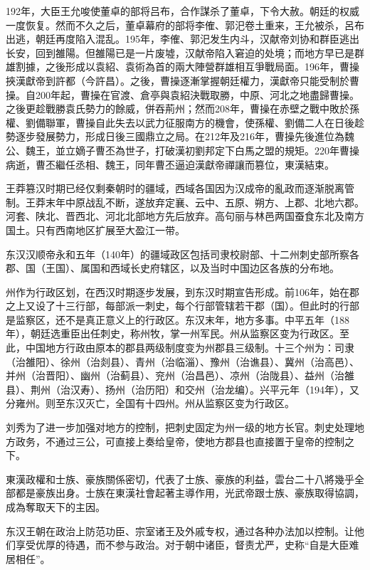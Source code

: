 192年，大臣王允唆使董卓的部将吕布，合作謀杀了董卓，下令大赦。朝廷的权威一度恢复。然而不久之后，董卓幕府的部将李傕、郭汜卷土重来，王允被杀，呂布出逃，朝廷再度陷入混乱。195年，李傕、郭汜发生内斗，汉献帝刘协和群臣逃出长安，回到雒陽。但雒陽已是一片废墟，汉献帝陷入窘迫的处境；而地方早已是群雄割據，之後形成以袁紹、袁術為首的兩大陣營群雄相互爭戰局面。196年，曹操挾漢獻帝到許都（今許昌）。之後，曹操逐漸掌握朝廷權力，漢獻帝只能受制於曹操。自200年起，曹操在官渡、倉亭與袁紹決戰取勝，中原、河北之地盡歸曹操。之後更趁戰勝袁氏勢力的餘威，併吞荊州；然而208年，曹操在赤壁之戰中敗於孫權、劉備聯軍，曹操自此失去以武力征服南方的機會，使孫權、劉備二人在日後趁勢逐步發展勢力，形成日後三國鼎立之局。在212年及216年，曹操先後進位為魏公、魏王，並立嫡子曹丕為世子，打破漢初劉邦定下白馬之盟的規矩。220年曹操病逝，曹丕繼任丞相、魏王，同年曹丕逼迫漢獻帝禪讓而篡位，東漢結束。

王莽篡汉时期已经仅剩秦朝时的疆域，西域各国因为汉成帝的亂政而逐渐脱离管制。王莽末年中原战乱不断，遂放弃定襄、云中、五原、朔方、上郡、北地六郡。河套、陕北、晋西北、河北北部地方先后放弃。高句丽与林邑两国蚕食东北及南方国土。只有西南地区扩展至大盈江一带。

东汉汉顺帝永和五年（140年）的疆域政区包括司隶校尉部、十二州刺史部所察各郡、国（王国）、属国和西域长史府辖区，以及当时中国边区各族的分布地。

州作为行政区划，在西汉时期逐步发展，到东汉时期宣告形成。前106年，始在郡之上又设了十三行部，每部派一刺史，每个行部管辖若干郡（国）。但此时的行部是监察区，还不是真正意义上的行政区。东汉末年，地方多事。中平五年（188年），朝廷选重臣出任刺史，称州牧，掌一州军民。州从监察区变为行政区。至此，中国地方行政由原本的郡县两级制度变为州郡县三级制。十三个州为：司隶（治雒阳）、徐州（治剡县）、青州（治临淄）、豫州（治谯县）、冀州（治高邑）、并州（治晋阳）、幽州（治蓟县）、兖州（治昌邑）、凉州（治陇县）、益州（治雒县）、荆州（治汉寿）、扬州（治历阳）和交州（治龙编）。兴平元年（194年），又分雍州。则至东汉灭亡，全国有十四州。州从监察区变为行政区。

刘秀为了进一步加强对地方的控制，把刺史固定为州一级的地方长官。刺史处理地方政务，不通过三公，可直接上奏给皇帝，使地方郡县也直接置于皇帝的控制之下。

東漢政權和士族、豪族關係密切，代表了士族、豪族的利益，雲台二十八將幾乎全部都是豪族出身。士族在東漢社會起著主導作用，光武帝跟士族、豪族取得協調，成為奪取天下的主因。

东汉王朝在政治上防范功臣、宗室诸王及外戚专权，通过各种办法加以控制。让他们享受优厚的待遇，而不参与政治。对于朝中诸臣，督责尤严，史称“自是大臣难居相任”。

